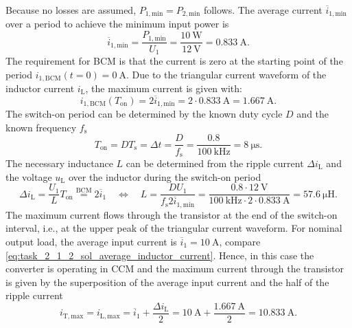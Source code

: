 \begin{solutionblock}
	Because no losses are assumed, $P_{\mathrm{1,min}}=P_{\mathrm{2,min}}$ follows. The average current $\overline i_{\mathrm{1,min}}$ over a period to achieve the minimum input power is
	\begin{equation}
		\overline i_{\mathrm{1,min}} = \frac{P_{\mathrm{1,min}}}{U_{\mathrm{1}}} = \frac{\SI{10}{\watt}}{\SI{12}{\volt}}= \SI{0.833}{\ampere}.
	\end{equation}
	The requirement for BCM is that the current is zero at the starting point of the period  $i_\mathrm{1,BCM}(t=0)=\SI{0}{\ampere}$.
	Due to the triangular current waveform of the inductor current $i_{\mathrm{L}}$, the maximum current is given with:
	\begin{equation}
		i_\mathrm{1,BCM}(T_{\mathrm{on}})= 2 \overline i_{\mathrm{1,min}}= 2\cdot \SI{0.833}{\ampere} = \SI{1.667}{\ampere}.
	\end{equation}
	The switch-on period can be determined by the known duty cycle $D$ and the known frequency $f_{\mathrm{s}}$
	\begin{equation}
		T_{\mathrm{on}} = D T_{\mathrm{s}} = \Delta t = \frac{D}{f_{\mathrm{s}}} = \frac{0.8}{\SI{100}{\kilo\hertz}}=\SI{8}{\micro\second}.
	\end{equation}
	The necessary inductance $L$ can be determined from the ripple current $\Delta i_\mathrm{L}$ and the voltage $u_\mathrm{L}$ over the inductor during the switch-on period
	\begin{equation}
		\Delta i_\mathrm{L} = \frac{U_1}{L}T_{\mathrm{on}}\stackrel{\mathrm{BCM}}{=}2\overline{i}_\mathrm{1} \quad \Leftrightarrow \quad L= \frac{D U_\mathrm{1}}{f_{\mathrm{s}}2\overline{i}_{\mathrm{1,min}}} = \frac{0.8 \cdot \SI{12}{\volt}}{\SI{100}{\kilo\hertz\cdot 2\cdot \SI{0.833}{\ampere}}} = \SI{57.6}{\micro\henry}.
	\end{equation}
	The maximum current flows through the transistor at the end of the switch-on interval, i.e., at the upper peak of the triangular current waveform. For nominal output load, the average input current is $\overline i_\mathrm{1} = \SI{10}{\ampere}$, compare \eqref{eq:task_2_1_2_sol_average_inductor_current}. Hence, in this case the converter is operating in CCM and the maximum current through the transistor is given by the superposition of the average input current and the half of the ripple current
	\begin{equation}
		i_\mathrm{T,max} = i_\mathrm{L,max}=\overline i_\mathrm{1} + \frac{\Delta i_\mathrm{L}}{2} = \SI{10}{\ampere} + \frac{\SI{1.667}{\ampere}}{2} = \SI{10.833}{\ampere}.
	\end{equation}
\end{solutionblock}

